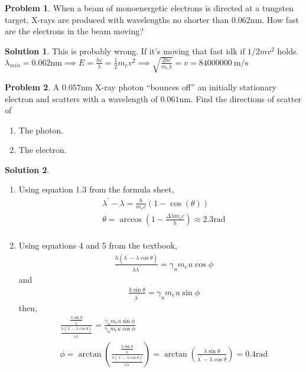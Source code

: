 \documentclass[10pt]{article}
\theoremstyle{definition}
\newtheorem{problem}{Problem}
\newtheorem{soln}{Solution}
\begin{document}
\begin{problem}
When a beam of monoenergetic electrons is directed at a tungsten target, X-rays are produced with wavelengths no shorter than
$0.062\unit{\nano\meter}$. How fast are the electrons in the beam moving?
\end{problem}
\begin{soln} This is probably wrong. If it's moving that fast idk if $1/2mv^2$ holds.
  $\lambda_{min}=0.062\unit{\nano\meter}\implies E=\frac{hc}{\lambda}=\frac{1}{2}m_ev^2\implies\sqrt{\frac{2hc}{m_e\lambda}}=v=\qty{84000000}{\meter\per\second}$
\end{soln}

\begin{problem}
A $0.057\unit{\nano\meter}$ X-ray photon ``bounces off'' an initially stationary electron and scatters with a wavelength of $0.061\unit{\nano\meter}$. Find the directions of scatter of
\begin{enumerate}[label=(\alph*)]
  \item The photon.
  \item The electron.
\end{enumerate}
\end{problem}
\begin{soln}~
  \begin{enumerate}[label=(\alph*)]
    \item Using equation 1.3 from the formula sheet,
  \begin{align*}
    & \lambda^\prime-\lambda=\frac{h}{m_ec}\left(1-\cos(\theta)\right)\\
    & \theta=\arccos\left(1-\frac{\Delta\lambda m_e c}{h}\right)\approx2.3\unit{\radian}\\
  \end{align*}
    \item Using equations 4 and 5 from the textbook,
    \begin{align*}
      & \frac{h\left(\lambda^\prime-\lambda\cos\theta\right)}{\lambda\lambda^\prime}=\gamma_um_eu\cos\phi
    \end{align*}
    and
    \begin{align*}
      & \frac{h\sin\theta}{\lambda^\prime}=\gamma_um_eu\sin\phi
    \end{align*}
    then,
    \begin{align*}
      & \frac{\frac{h\sin\theta}{\lambda^\prime}}{\frac{h\left(\lambda^\prime-\lambda\cos\theta\right)}{\lambda\lambda^\prime}}=\frac{\gamma_um_eu\sin\phi}{\gamma_um_eu\cos\phi} \\
      & \phi=\arctan\left(\frac{\frac{h\sin\theta}{\lambda^\prime}}{\frac{h\left(\lambda^\prime-\lambda\cos\theta\right)}{\lambda\lambda^\prime}}\right)=\arctan\left(\frac{\lambda\sin\theta}{\lambda^\prime-\lambda\cos\theta} \right)=0.4\unit{\radian}
    \end{align*}
  \end{enumerate}


\end{soln}
\end{document}
